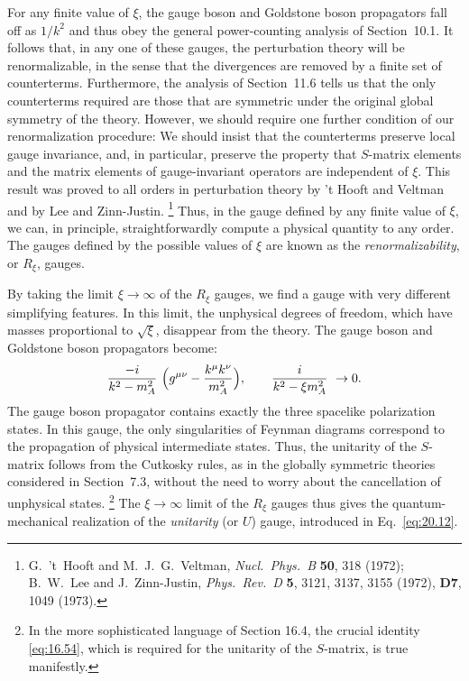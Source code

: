 For any finite value of $\xi$, the gauge boson and Goldstone boson propagators
fall off as $1/k^2$ and thus obey the general power-counting analysis of
Section~10.1.  It follows that, in any one of these gauges, the perturbation
theory will be renormalizable, in the sense that the divergences are removed
by a finite set of counterterms.  Furthermore, the analysis of Section~11.6
tells us that the only counterterms required are those that are symmetric
under the original global symmetry of the theory.  However, we should require
one further condition of our renormalization procedure: We should insist
that the counterterms preserve local gauge invariance, and, in particular,
preserve the property that $S$-matrix elements and the matrix elements of
gauge-invariant operators are independent of $\xi$.  This result was proved
to all orders in perturbation theory by 't Hooft and Veltman and by Lee and
Zinn-Justin.%
\footnote{G.~'t~Hooft and M.~J.~G.~Veltman, \emph{Nucl.\ Phys.\ B} \textbf{50},
318 (1972); B.~W.~Lee and J.~Zinn-Justin, \emph{Phys.\ Rev.\ D} \textbf{5},
3121, 3137, 3155 (1972), \textbf{D7}, 1049 (1973).}  Thus, in the gauge
defined by any finite value of $\xi$, we can, in principle, straightforwardly
compute a physical quantity to any order.  The gauges defined by the possible
values of $\xi$ are known as the \emph{renormalizability}, or $R_\xi$, gauges.

By taking the limit $\xi\to\infty$ of the $R_\xi$ gauges, we find a gauge
with very different simplifying features.  In this limit, the unphysical
degrees of freedom, which have masses proportional to $\sqrt{\xi}$,
disappear from the theory.  The gauge boson and Goldstone boson propagators
become:
\begin{equation}
  \frac{-i}{k^2 - m_A^2}\ \Bigl( g^{\mu\nu} - \frac{k^\mu k^\nu}{m_A^2}
    \Bigr),\qquad \frac{i}{k^2 - \xi m_A^2}\ \to 0 .
\end{equation}
The gauge boson propagator contains exactly the three spacelike polarization
states.  In this gauge, the only singularities of Feynman diagrams correspond
to the propagation of physical intermediate states.  Thus, the unitarity of
the $S$-matrix follows from the Cutkosky rules, as in the globally symmetric
theories considered in Section~7.3, without the need to worry about the
cancellation of unphysical states.%
\footnote{In the more sophisticated language of Section 16.4, the crucial
identity \eqref{eq:16.54}, which is required for the unitarity of the
$S$-matrix, is true manifestly.}  The $\xi\to\infty$ limit of the $R_\xi$
gauges thus gives the quantum-mechanical realization of the \emph{unitarity}
(or $U$) gauge, introduced in Eq.~\eqref{eq:20.12}.

